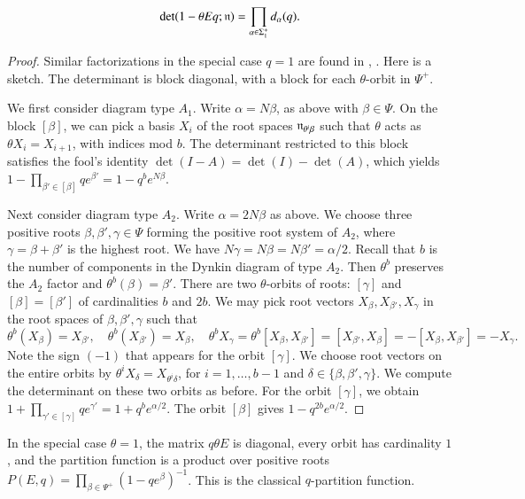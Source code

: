 \begin{lemma} \label{lemma:prod}
\[
\det(1-\theta  E q ;{\mathfrak n}) = \prod_{\alpha\in\Sigma^+_1} d_\alpha(q).
\]
\end{lemma}

\begin{proof} Similar factorizations in the special case $q=1$ are
  found in \cite{jantzen1977darstellungen}, \cite{wendt2001weyl}.
  Here is a sketch.  The determinant is block diagonal, with a block
  for each $\theta$-orbit in $\Psi^+$.

  We first consider diagram type $A_1$.  Write $\alpha = N\beta$, as
  above with $\beta\in\Psi$.  On the block $[\beta]$, we can pick a
  basis $X_i$ of the root spaces ${\mathfrak n}_{\theta^i\beta}$ such that
  $\theta$ acts as $\theta X_i = X_{i+1}$, with indices mod $b$.  The
  determinant restricted to this block satisfies the fool's identity
  $\det(I-A) = \det(I)-\det(A)$, which yields $1- \prod_{\beta'\in
    [\beta]} {q e^{\beta'}} = 1- q^b e^{N \beta}$.

  Next consider diagram type $A_2$.  Write $\alpha = 2N\beta$ as
  above.  We choose three positive roots $\beta,\beta',\gamma\in\Psi$
  forming the positive root system of $A_2$, where
  $\gamma=\beta+\beta'$ is the highest root.  We have
  $N\gamma=N\beta=N\beta'=\alpha/2$.  Recall that $b$ is the number of
  components in the Dynkin diagram of type $A_2$.  Then $\theta^b$
  preserves the $A_2$ factor and $\theta^b(\beta)=\beta'$.  There are
  two $\theta$-orbits of roots: $[\gamma]$ and $[\beta]=[\beta']$ of
  cardinalities $b$ and $2b$.  We may pick root vectors
  $X_{\beta},X_{\beta'},X_{\gamma}$ in the root spaces of
  $\beta,\beta',\gamma$ such that
\[
\theta^b(X_\beta)= X_{\beta'},\quad \theta^b(X_{\beta'})=X_\beta,\quad
\theta^b X_\gamma = \theta^b [X_\beta,X_{\beta'}] 
= [X_{\beta'},X_\beta] = -[X_\beta,X_{\beta'}] = -X_\gamma.
\]
Note the sign $(-1)$ that appears for the orbit $[\gamma]$.  We choose
root vectors on the entire orbits by $\theta^i X_\delta=X_{\theta^i
  \delta}$, for $i=1,\ldots,b-1$ and
$\delta\in\{\beta,\beta',\gamma\}$.  We compute the determinant on
these two orbits as before.  For the orbit $[\gamma]$, we obtain
$1+\prod_{\gamma'\in [\gamma]} {q e^{\gamma'}} = 1+ q^b e^{\alpha/2}$.
The orbit $[\beta]$ gives $1-q^{2b} e^{\alpha/2}$.
\end{proof}

In the special case $\theta=1$, the matrix $q \theta E$ is diagonal,
every orbit has cardinality $1$, and the partition function is a
product over positive roots $P(E,q) = \prod_{\beta\in\Psi^+} (1- q
e^\beta)^{-1}$.  This is the classical $q$-partition function.

